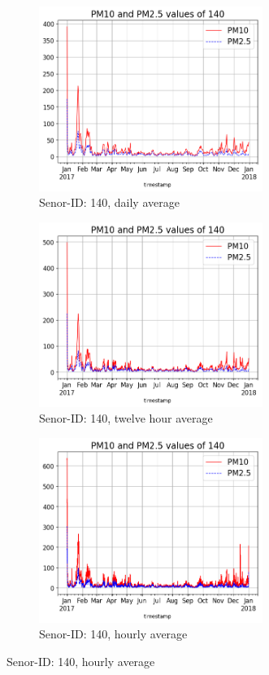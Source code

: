 \documentclass[12pt,a4paper,twoside]{scrartcl}
\numberwithin{equation}{section}
\begin{document}
\begin{figure}[H]
  \centering
  \begin{subfigure}[t]{0.32\textwidth}
    \includegraphics[width=\textwidth,height=6cm]{figures/plots_1d/140_plot}%
    \caption{Senor-ID: 140, daily average}
  \end{subfigure}
  \begin{subfigure}[t]{0.32\textwidth}
    \includegraphics[width=\textwidth,height=6cm]{figures/plots_12h/140_plot}%
    \caption{Senor-ID: 140, twelve hour average}
  \end{subfigure}
  \begin{subfigure}[t]{0.32\textwidth}
    \includegraphics[width=\textwidth,height=6cm]{figures/plots_1h/140_plot}%
    \caption{Senor-ID: 140, hourly average}
  \end{subfigure}


\end{figure}
\end{document}
